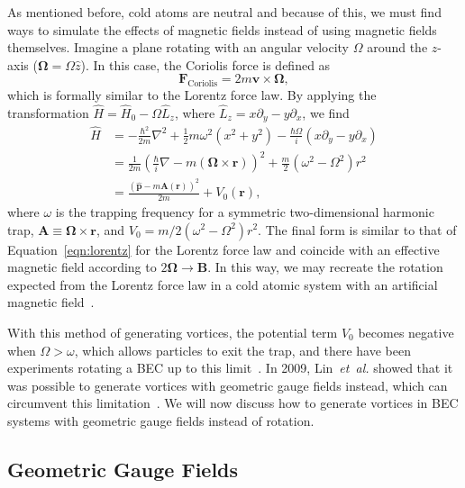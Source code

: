 As mentioned before, cold atoms are neutral and because of this, we must find ways to simulate the effects of magnetic fields instead of using magnetic fields themselves.
Imagine a plane rotating with an angular velocity $\Omega$ around the $z$-axis ($\mathbf{\Omega} = \Omega \hat z$). 
In this case, the Coriolis force is defined as
\begin{equation}
\mathbf{F}_{\text{Coriolis}} = 2m \mathbf{v} \times \mathbf{\Omega},
\end{equation}
which is formally similar to the Lorentz force law.
By applying the transformation $\hat H = \hat H_0 - \Omega \hat L_z$, where $\hat L_z = x\partial_y - y\partial_x$, we find~\cite{Bhat2008}
\begin{equation}
\begin{split}
\hat H &= -\frac{\hbar^2}{2m}\nabla^2 + \frac 1 2 m \omega^2(x^2 + y^2) - \frac{\hbar \Omega}{i}(x\partial_y - y\partial_x) \\
 &= \frac{1}{2m}\left(\frac{\hbar}{i}\nabla - m(\mathbf{\Omega} \times \mathbf{r})\right)^2 + \frac m 2 \left( \omega^2 - \Omega^2 \right)r^2 \\
 &= \frac{(\hat{\mathbf{p}}-m\mathbf{A}(\mathbf{r}))^2}{2m}+ V_0(\mathbf{r}),
\end{split}
\end{equation}
where $\omega$ is the trapping frequency for a symmetric two-dimensional harmonic trap, $\mathbf{A} \equiv \mathbf{\Omega} \times \mathbf{r}$, and $V_0 = m/2 \left( \omega^2 - \Omega^2 \right)r^2$.
The final form is similar to that of Equation~\eqref{eqn:lorentz} for the Lorentz force law and coincide with an effective magnetic field according to $2 \mathbf \Omega \rightarrow \mathbf B$.
In this way, we may recreate the rotation expected from the Lorentz force law in a cold atomic system with an artificial magnetic field~\cite{Peshkin1989, Madison2000, Abo-Shaeer2001}.

With this method of generating vortices, the potential term $V_0$ becomes negative when $\Omega > \omega$, which allows particles to exit the trap, and there have been experiments rotating a BEC up to this limit~\cite{Schweikhard2004}.
In 2009, Lin~\textit{et~al.} showed that it was possible to generate vortices with geometric gauge fields instead, which can circumvent this limitation~\cite{Lin2009}.
We will now discuss how to generate vortices in BEC systems with geometric gauge fields instead of rotation.

\subsection{Geometric Gauge Fields}
\label{sec:geom}

